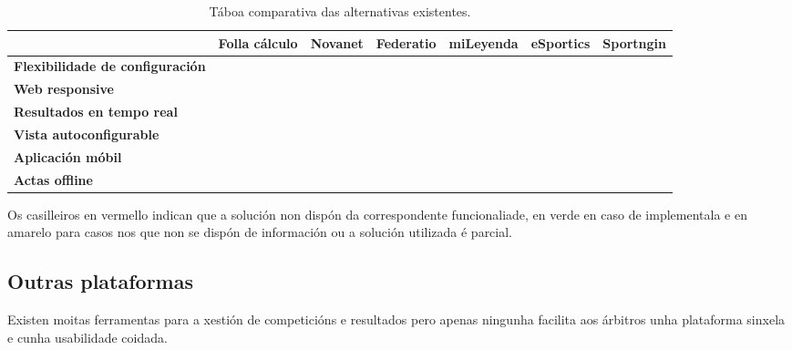     \begin{table}[h]
      \centering
        \hspace*{-1.5cm}
        \begin{tabular}{| l | c | c | c | c | c | c |}
        \hline
           & Folla cálculo & Novanet & Federatio & miLeyenda & eSportics & 
Sportngin \\ \hline
    \textbf{Flexibilidade de configuración}  & 
\cellcolor{green!80!black} & \cellcolor{red} & \cellcolor{red} & 
\cellcolor{yellow} & \cellcolor{red} & \cellcolor{green!80!black} \\
\hline
    \textbf{Web responsive} & \cellcolor{red} & \cellcolor{green!80!black} & 
\cellcolor{red} &  \cellcolor{green!80!black} & \cellcolor{red} & 
\cellcolor{green!80!black} \\ \hline
    \textbf{Resultados en tempo real} & \cellcolor{red} & \cellcolor{red} & 
\cellcolor{yellow} & \cellcolor{green!80!black} & \cellcolor{yellow} & 
\cellcolor{green!80!black} \\
\hline
    \textbf{Vista autoconfigurable} & \cellcolor{red} & 
\cellcolor{red} & \cellcolor{red} & \cellcolor{green!80!black} & 
\cellcolor{red} & \cellcolor{green!80!black} \\
\hline
    \textbf{Aplicación móbil} & \cellcolor{red} & \cellcolor{red} & 
\cellcolor{red} & \cellcolor{green!80!black} & \cellcolor{red} & 
\cellcolor{green!80!black} \\
\hline
    \textbf{Actas offline} & \cellcolor{red} & \cellcolor{red} & 
\cellcolor{red} & \cellcolor{red} & \cellcolor{red} & \cellcolor{green!80!black} 
\\
\hline
        \end{tabular}
        \hspace*{-1.5cm}
        \caption{Táboa comparativa das alternativas 
existentes.}
      \label{table:competitors}
      \end{table}

            Os casilleiros en vermello indican que a solución non dispón da 
correspondente funcionaliade, en verde en caso de implementala e en amarelo 
para casos nos que non se dispón de información ou a solución utilizada é 
parcial.

    \subsection{Outras plataformas}
    Existen moitas ferramentas para a xestión de competicións e resultados pero apenas 
ningunha facilita aos árbitros unha plataforma sinxela e cunha 
usabilidade coidada.

